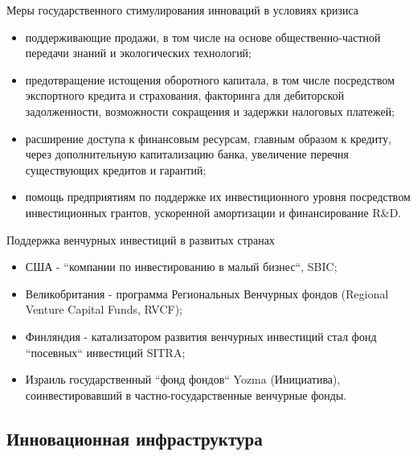 \documentclass[_Venture_p3.tex]{subfiles}
\begin{document}
\begin{frame}[allowframebreaks]{Меры государственного стимулирования инноваций }{в условиях кризиса}
\begin{itemize}
	\item поддерживающие продажи, в том числе на основе общественно-частной передачи знаний и экологических технологий;

	\pagebreak
	\item предотвращение истощения оборотного капитала, в том числе посредством экспортного кредита и страхования, факторинга для дебиторской задолженности, возможности сокращения и задержки налоговых платежей;

	\pagebreak
	\item расширение доступа к финансовым ресурсам, главным образом к кредиту, через дополнительную капитализацию банка, увеличение перечня существующих кредитов и гарантий;

	\pagebreak
	\item помощь предприятиям по поддержке их инвестиционного уровня посредством инвестиционных грантов, ускоренной амортизации и финансирование R\&D.
\end{itemize}
\end{frame}


\begin{frame}[allowframebreaks]{Поддержка венчурных инвестиций в развитых странах}{}
\begin{itemize}
	\item США - ``компании по инвестированию в малый бизнес``, SBIC;
	\item Великобритания - программа Региональных Венчурных фондов (Regional Venture Capital Funds, RVCF);
	
	\pagebreak
	\item Финляндия - катализатором развития венчурных инвестиций стал фонд ``посевных`` инвестиций SITRA;
	\item Израиль государственный ``фонд фондов`` Yozma (Инициатива), соинвестировавший в частно-государственные венчурные фонды.	
\end{itemize}
\end{frame}


\subsection{Инновационная инфраструктура}
\end{document}
